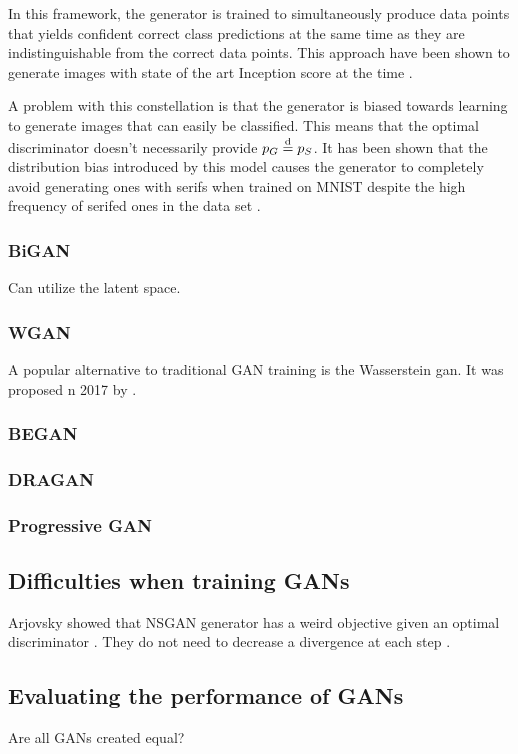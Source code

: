 In this framework, the generator is trained to simultaneously produce data points that yields confident correct class predictions at the same time as they are indistinguishable from the correct data points. This approach have been shown to generate images with state of the art Inception score at the time \parencite{odena2016conditional}.

A problem with this constellation is that the generator is biased towards learning to generate images that can easily be classified. This means that the optimal discriminator doesn't necessarily provide $p_G \stackrel{\text{d}}{=} p_S$. It has been shown that the distribution bias introduced by this model causes the generator to completely avoid generating ones with serifs when trained on MNIST despite the high frequency of serifed ones in the data set \textcite{shuac2017acganisbad}.

\subsubsection{BiGAN}
Can utilize the latent space.
\subsubsection{WGAN}
A popular alternative to traditional GAN training is the Wasserstein \acrshort{gan}. It was proposed n 2017 by \textcite{arjovsky2017wasserstein}.

\subsubsection{BEGAN}
\subsubsection{DRAGAN}
\subsubsection{Progressive GAN}

\subsection{Difficulties when training GANs}
Arjovsky showed that NSGAN generator has a weird objective given an optimal discriminator \textcite{arjovsky2017towards}.
They do not need to decrease a divergence at each step \textcite{fedus2017many}.

\subsection{Evaluating the performance of GANs}
Are all GANs created equal? \textcite{lucic2017gans}

